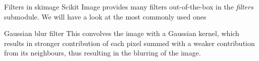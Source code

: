 \documentclass[9pt, aspectratio=169]{beamer}
\begin{document}
\begin{frame}
	{Filters in skimage}
	Scikit Image provides many filters out-of-the-box in the \textit{filters} submodule.
	We will have a look at the most commonly used ones
\end{frame}

\begin{frame}
	{Gaussian blur filter}
	This convolves the image with a Gaussian kernel, which results in stronger contribution of each pixel summed with a weaker contribution from its neighbours, thus resulting in the blurring of the image.


\end{frame}
\end{document}
